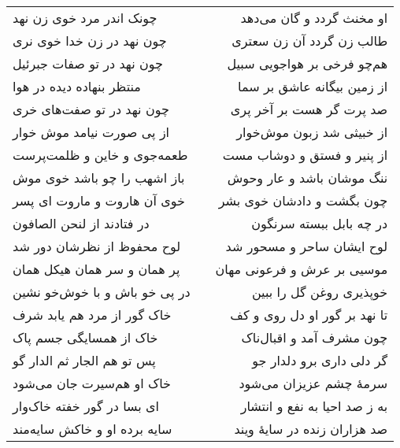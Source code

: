 \begin{center}
\begin{longtable}{l p{0.5cm} r}
چونک اندر مرد خوی زن نهد
&&
او مخنث گردد و گان می‌دهد
\\
چون نهد در زن خدا خوی نری
&&
طالب زن گردد آن زن سعتری
\\
چون نهد در تو صفات جبرئیل
&&
هم‌چو فرخی بر هواجویی سبیل
\\
منتظر بنهاده دیده در هوا
&&
از زمین بیگانه عاشق بر سما
\\
چون نهد در تو صفت‌های خری
&&
صد پرت گر هست بر آخر پری
\\
از پی صورت نیامد موش خوار
&&
از خبیثی شد زبون موش‌خوار
\\
طعمه‌جوی و خاین و ظلمت‌پرست
&&
از پنیر و فستق و دوشاب مست
\\
باز اشهب را چو باشد خوی موش
&&
ننگ موشان باشد و عار وحوش
\\
خوی آن هاروت و ماروت ای پسر
&&
چون بگشت و دادشان خوی بشر
\\
در فتادند از لنحن الصافون
&&
در چه بابل ببسته سرنگون
\\
لوح محفوظ از نظرشان دور شد
&&
لوح ایشان ساحر و مسحور شد
\\
پر همان و سر همان هیکل همان
&&
موسیی بر عرش و فرعونی مهان
\\
در پی خو باش و با خوش‌خو نشین
&&
خوپذیری روغن گل را ببین
\\
خاک گور از مرد هم یابد شرف
&&
تا نهد بر گور او دل روی و کف
\\
خاک از همسایگی جسم پاک
&&
چون مشرف آمد و اقبال‌ناک
\\
پس تو هم الجار ثم الدار گو
&&
گر دلی داری برو دلدار جو
\\
خاک او هم‌سیرت جان می‌شود
&&
سرمهٔ چشم عزیزان می‌شود
\\
ای بسا در گور خفته خاک‌وار
&&
به ز صد احیا به نفع و انتشار
\\
سایه برده او و خاکش سایه‌مند
&&
صد هزاران زنده در سایهٔ ویند
\\
\end{longtable}
\end{center}
